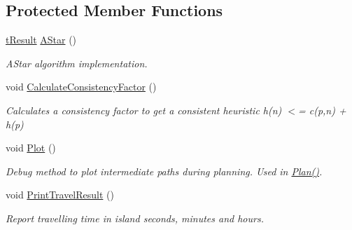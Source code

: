 \subsection*{Protected Member Functions}
\begin{DoxyCompactItemize}
\item 
\mbox{\hyperlink{structt_result}{t\+Result}} \mbox{\hyperlink{classplanner_1_1c_planner_a341e70531266f023ac9461d18979d1ef}{A\+Star}} ()
\begin{DoxyCompactList}\small\item\em A\+Star algorithm implementation. \end{DoxyCompactList}\item 
void \mbox{\hyperlink{classplanner_1_1c_planner_a2e5a745f83f903662eff914d8beddb5e}{Calculate\+Consistency\+Factor}} ()
\begin{DoxyCompactList}\small\item\em Calculates a consistency factor to get a consistent heuristic h(n) $<$= c(p,n) + h(p) \end{DoxyCompactList}\item 
\mbox{\label{classplanner_1_1c_planner_a236a68e02c7a99323f2d30b3097aa767}} 
void \mbox{\hyperlink{classplanner_1_1c_planner_a236a68e02c7a99323f2d30b3097aa767}{Plot}} ()
\begin{DoxyCompactList}\small\item\em Debug method to plot intermediate paths during planning. Used in \mbox{\hyperlink{classplanner_1_1c_planner_a21230c015260b9fc34ad2f239592470e}{Plan()}}. \end{DoxyCompactList}\item 
\mbox{\label{classplanner_1_1c_planner_ad8d82968444f958f1b7e7acdd9df2e64}} 
void \mbox{\hyperlink{classplanner_1_1c_planner_ad8d82968444f958f1b7e7acdd9df2e64}{Print\+Travel\+Result}} ()
\begin{DoxyCompactList}\small\item\em Report travelling time in island seconds, minutes and hours. \end{DoxyCompactList}\end{DoxyCompactItemize}
